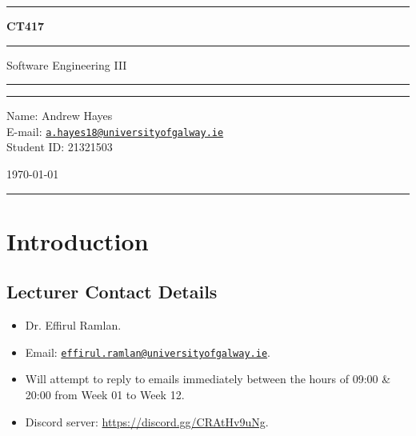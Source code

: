 \documentclass[a4paper,11pt]{article}
\author{Andrew Hayes}
\begin{document}
\begin{titlepage}
    \begin{center}
        \hrule
        \vspace*{0.6cm}
        \huge \textbf{CT417}
        \vspace*{0.6cm}
        \hrule
        \LARGE
        \vspace{0.5cm}
            Software Engineering III
        \vspace{0.5cm}
        \hrule

        \vfill
        \vfill

        \hrule
        \begin{minipage}{0.495\textwidth} 
            \vspace{0.4em}
            \raggedright
            \normalsize 
            Name: Andrew Hayes \\
            E-mail: \href{mailto://a.hayes18@universityofgalway.ie}{\texttt{a.hayes18@universityofgalway.ie}}  \hfill\\
            Student ID: 21321503 \hfill
        \end{minipage}
        \begin{minipage}{0.495\textwidth} 
            \raggedleft
            \vspace*{0.8cm}
            \Large
            \today
            \vspace*{0.6cm}
        \end{minipage}
        \medskip\hrule 
    \end{center}
\end{titlepage}

\newpage
\tableofcontents
\newpage
\setcounter{page}{1}

\section{Introduction}
\subsection{Lecturer Contact Details}
\begin{itemize}
    \item   Dr. Effirul Ramlan.
    \item   Email: \href{mailto://effirul.ramlan@universityofgalway.ie}{\texttt{effirul.ramlan@universityofgalway.ie}}.
    \item   Will attempt to reply to emails immediately between the hours of 09:00 \& 20:00 from Week 01 to
            Week 12.
    \item   Discord server: \url{https://discord.gg/CRAtHv9uNg}.
\end{itemize}
\end{document}
